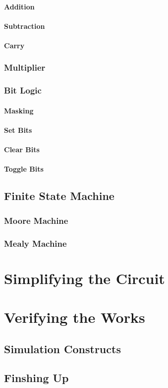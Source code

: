 \documentclass[a4paper,11pt]{book}
\begin{document}
\subsection{Addition}
\subsection{Subtraction}
\subsection{Carry}
\section{Multiplier}
\section{Bit Logic}
\subsection{Masking}
\subsection{Set Bits}
\subsection{Clear Bits}
\subsection{Toggle Bits}

\chapter{Finite State Machine}
\section{Moore Machine}
\section{Mealy Machine}

\part{Simplifying the Circuit}

\part{Verifying the Works}

\chapter{Simulation Constructs}
\chapter{Finshing Up}

\backmatter

% 
\end{document}
